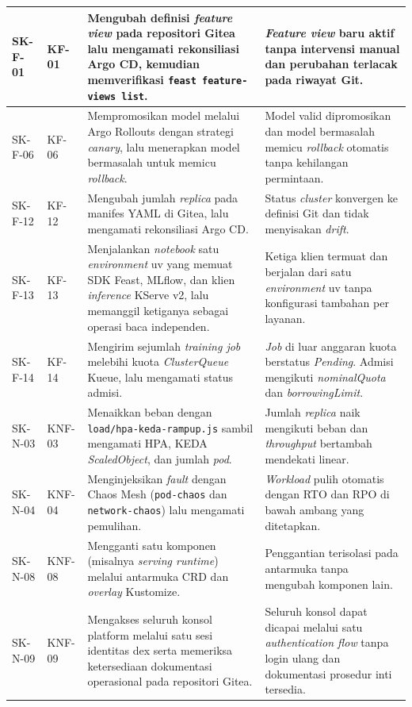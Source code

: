 {\begin{longtable}{|>{\centering\arraybackslash}m{1.4cm}|>{\centering\arraybackslash}m{1.75cm}|m{5.9cm}|m{4cm}|}
SK-F-01 & KF-01 & Mengubah definisi \textit{feature view} pada repositori Gitea lalu mengamati rekonsiliasi Argo CD, kemudian memverifikasi \texttt{feast feature-views list}. & \textit{Feature view} baru aktif tanpa intervensi manual dan perubahan terlacak pada riwayat Git. \\
\hline
SK-F-06 & KF-06 & Mempromosikan model melalui Argo Rollouts dengan strategi \textit{canary}, lalu menerapkan model bermasalah untuk memicu \textit{rollback}. & Model valid dipromosikan dan model bermasalah memicu \textit{rollback} otomatis tanpa kehilangan permintaan. \\
\hline
SK-F-12 & KF-12 & Mengubah jumlah \textit{replica} pada manifes YAML di Gitea, lalu mengamati rekonsiliasi Argo CD. & Status \textit{cluster} konvergen ke definisi Git dan tidak menyisakan \textit{drift}. \\
\hline
SK-F-13 & KF-13 & Menjalankan \textit{notebook} satu \textit{environment} uv yang memuat SDK Feast, MLflow, dan klien \textit{inference} KServe v2, lalu memanggil ketiganya sebagai operasi baca independen. & Ketiga klien termuat dan berjalan dari satu \textit{environment} uv tanpa konfigurasi tambahan per layanan. \\
\hline
SK-F-14 & KF-14 & Mengirim sejumlah \textit{training job} melebihi kuota \textit{ClusterQueue} Kueue, lalu mengamati status admisi. & \textit{Job} di luar anggaran kuota berstatus \textit{Pending}. Admisi mengikuti \textit{nominalQuota} dan \textit{borrowingLimit}. \\
\hline
SK-N-03 & KNF-03 & Menaikkan beban dengan \texttt{load/hpa-keda-rampup.js} sambil mengamati HPA, KEDA \textit{ScaledObject}, dan jumlah \textit{pod}. & Jumlah \textit{replica} naik mengikuti beban dan \textit{throughput} bertambah mendekati linear. \\
\hline
SK-N-04 & KNF-04 & Menginjeksikan \textit{fault} dengan Chaos Mesh (\texttt{pod-chaos} dan \texttt{network-chaos}) lalu mengamati pemulihan. & \textit{Workload} pulih otomatis dengan RTO dan RPO di bawah ambang yang ditetapkan. \\
\hline
SK-N-08 & KNF-08 & Mengganti satu komponen (misalnya \textit{serving runtime}) melalui antarmuka CRD dan \textit{overlay} Kustomize. & Penggantian terisolasi pada antarmuka tanpa mengubah komponen lain. \\
\hline
SK-N-09 & KNF-09 & Mengakses seluruh konsol platform melalui satu sesi identitas dex serta memeriksa ketersediaan dokumentasi operasional pada repositori Gitea. & Seluruh konsol dapat dicapai melalui satu \textit{authentication flow} tanpa login ulang dan dokumentasi prosedur inti tersedia. \\

\end{longtable}}
